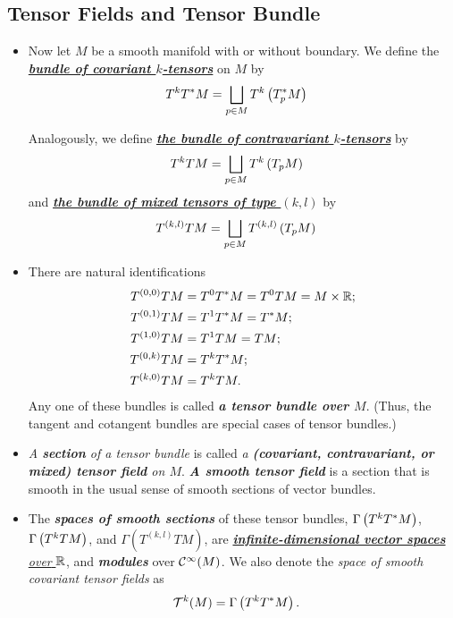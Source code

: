 \documentclass[11pt]{article}
\begin{document}
\subsection{Tensor Fields and Tensor Bundle}
\begin{itemize}
\item \begin{definition}
Now let $M$ be a smooth manifold with or without boundary. We define the \underline{\emph{\textbf{bundle of covariant $k$-tensors}}} on $M$ by
\begin{align*}
T^kT^{*}M &= \bigsqcup_{p \in M}T^k\left(T_{p}^{*}M\right) 
\end{align*}

Analogously, we define \underline{\emph{\textbf{the bundle of contravariant $k$-tensors}}} by
\begin{align*}
T^kTM &= \bigsqcup_{p \in M}T^k\left(T_{p}M\right) 
\end{align*}
and \underline{\emph{\textbf{the bundle of mixed tensors of type $(k,l)$}}} by
\begin{align*}
T^{(k,l)}TM &= \bigsqcup_{p \in M}T^{(k,l)}\left(T_{p}M\right)
\end{align*}
\end{definition}

\item \begin{remark}
There are natural identifications
\begin{align*}
T^{(0,0)}TM &= T^{0}T^{*}M = T^{0}TM = M \times {\mathbb R};\\
T^{(0,1)}TM &= T^{1}T^{*}M = T^{*}M;\\
T^{(1,0)}TM &= T^{1}TM = TM;\\
T^{(0,k)}TM &= T^{k}T^{*}M; \\
T^{(k,0)}TM &= T^{k}TM.
\end{align*}
Any one of these bundles is called \emph{\textbf{a tensor bundle over $M$}}. (Thus, the tangent and cotangent bundles are special cases of tensor bundles.) 
\end{remark}


\item \begin{definition}
\emph{A \textbf{section} of a tensor bundle} is called \emph{a \textbf{(covariant, contravariant, or mixed) tensor field} on $M$}. \emph{\textbf{A smooth tensor field}} is a section that is smooth in the usual sense of smooth sections of vector bundles. 
\end{definition}

\item \begin{remark}
The \emph{\textbf{spaces of smooth sections}} of these tensor bundles, $\Gamma\left(T^kT^{*}M\right)$, $\Gamma\left(T^kTM\right)$, and $\Gamma(T^{(k,l)}TM)$, are \underline{\emph{\textbf{infinite-dimensional vector spaces} over} ${\mathbb R}$}, and \emph{\textbf{modules}} over ${\mathcal C}^{\infty}(M)$. 
We also denote the \emph{space of smooth covariant tensor fields} as 
\begin{align*}
\mathcal{T}^{k}(M) &= \Gamma\left(T^kT^{*}M\right).
\end{align*}
\end{remark}


\end{itemize}
\end{document}
